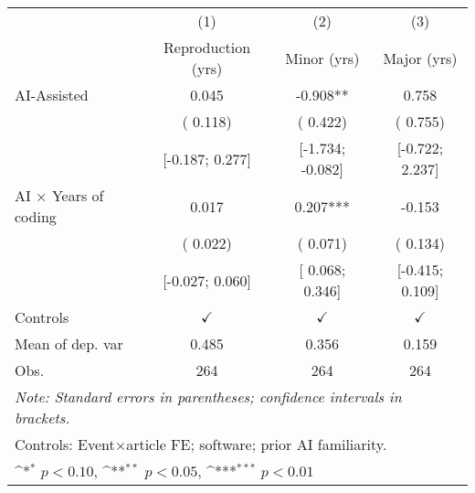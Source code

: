 \def\sym#1{\ifmmode^{#1}\else\(^{#1}\)\fi}
\begin{tabular}{l*{3}{c}}
\hline\hline
 & (1) & (2) & (3)
\\
 & Reproduction (yrs) & Minor (yrs) & Major (yrs)
 \\
\hline
AI-Assisted &  0.045 & -0.908** &  0.758
\\
 & ( 0.118) & ( 0.422) & ( 0.755)
\\
 & [-0.187;  0.277] & [-1.734; -0.082] & [-0.722;  2.237]
\\
AI × Years of coding &  0.017 &  0.207*** & -0.153
\\
 & ( 0.022) & ( 0.071) & ( 0.134)
\\
 & [-0.027;  0.060] & [ 0.068;  0.346] & [-0.415;  0.109]
\\
\hline
Controls & $\checkmark$ & $\checkmark$ & $\checkmark$
\\
Mean of dep. var &  0.485 &  0.356 &  0.159
\\
Obs. & 264 & 264 & 264
\\
\hline
\hline\hline
\multicolumn{4}{l}{\it{Note:} Standard errors in parentheses; confidence intervals in brackets.}\\
\multicolumn{4}{l}{Controls: Event×article FE; software; prior AI familiarity.}\\
\multicolumn{4}{l}{\sym{*} $p<0.10$, \sym{**} $p<0.05$,  \sym{***} $p<0.01$}\\
\end{tabular}
